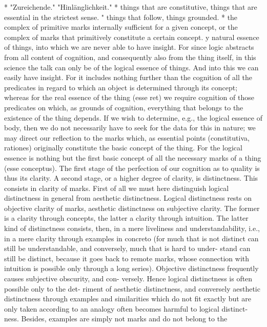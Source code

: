 *
"Zureichende."
"Hinlänglichkeit."
* things that are constitutive, things that are essential in the strictest sense.
" things that follow, things grounded.
* the complex of primitive marks internally sufficient for a given concept, or the complex of
marks that primitively constitute a certain concept.
y
natural essence of things, into which we are never able to have insight. For
since logic abstracts from all content of cognition, and consequently also
from the thing itself, in this science the talk can only be of the logical
essence of things. And into this we can easily have insight. For it includes
nothing further than the cognition of all the predicates in regard to which
an object is determined through its concept; whereas for the real essence of
the thing (esse ret) we require cognition of those predicates on which, as
grounds of cognition, everything that belongs to the existence of the thing
depends. If we wish to determine, e.g., the logical essence of body, then
we do not necessarily have to seek for the data for this in nature; we may
direct our reflection to the marks which, as essential points (constitutiva,
rationes) originally constitute the basic concept of the thing. For the logical
essence is nothing but the first basic concept of all the necessary marks of a
thing (esse conceptus).
The first stage of the perfection of our cognition as to quality is thus its
clarity. A second stage, or a higher degree of clarity, is distinctness. This
consists in clarity of marks.
First of all we must here distinguish logical distinctness in general from
aesthetic distinctness. Logical distinctness rests on objective clarity of
marks, aesthetic distinctness on subjective clarity. The former is a clarity
through concepts, the latter a clarity through intuition. The latter kind of
distinctness consists, then, in a mere liveliness and understandability, i.e., in
a mere clarity through examples in concreto (for much that is not distinct
can still be understandable, and conversely, much that is hard to under-
stand can still be distinct, because it goes back to remote marks, whose
connection with intuition is possible only through a long series).
Objective distinctness frequently causes subjective obscurity, and con-
versely. Hence logical distinctness is often possible only to the det-
riment of aesthetic distinctness, and conversely aesthetic distinctness
through examples and similarities which do not fit exactly but are only
taken according to an analogy often becomes harmful to logical distinct-
ness. Besides, examples are simply not marks and do not belong to the
